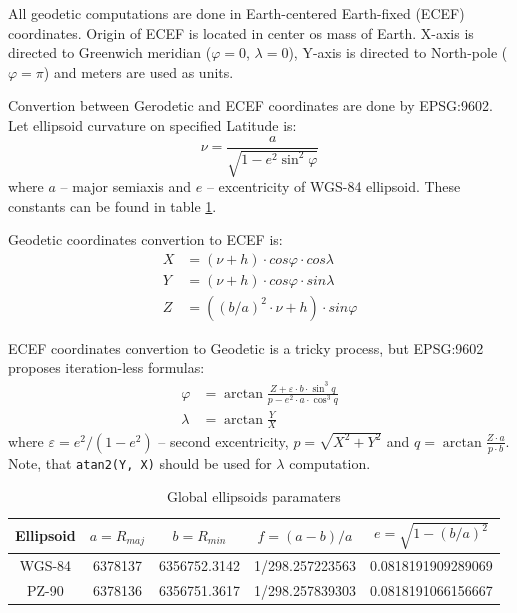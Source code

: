 \documentclass[10pt,letterpaper]{article}
\numberwithin{equation}{section}
\numberwithin{figure}{section}
\numberwithin{table}{section}
\begin{document}
All geodetic computations are done in Earth-centered Earth-fixed (ECEF) coordinates.
Origin of ECEF is located in center os mass of Earth. X-axis is directed to Greenwich
meridian ($\varphi = 0$, $\lambda = 0$), Y-axis is directed to North-pole ($\varphi = \pi$)
and meters are used as units.

Convertion between Gerodetic and ECEF coordinates are done by EPSG:9602.
Let ellipsoid curvature on specified Latitude is:
\begin{equation}
    \nu = \frac{a}{\sqrt{1 - e^2 \sin^2 \varphi}}
\end{equation}
where $a$ -- major semiaxis and $e$ -- excentricity of WGS-84 ellipsoid. These constants
can be found in table \ref{tab:ellps}.

Geodetic coordinates convertion to ECEF is:
\begin{equation}
    \begin{split}
        X & = (\nu + h) \cdot cos \varphi \cdot cos \lambda \\
        Y & = (\nu + h) \cdot cos \varphi \cdot sin \lambda \\
        Z & = ((b / a)^2 \cdot \nu + h) \cdot sin \varphi
    \end{split}
    \label{equ:geod2ecef}
\end{equation}

ECEF coordinates convertion to Geodetic is a tricky process, but EPSG:9602 proposes
iteration-less formulas:
\begin{equation}
    \begin{split}
        \varphi & = \arctan \frac{Z + \varepsilon \cdot b \cdot \sin^3 q}{p - e^2 \cdot a \cdot \cos^3 q} \\
        \lambda & = \arctan \frac{Y}{X}
    \end{split}
    \label{equ:ecef2geod}
\end{equation}
where $\varepsilon = e^2 / (1 - e^2)$ -- second excentricity, $p = \sqrt{X^2 + Y^2}$ and
$q = \arctan \frac{Z \cdot a}{p \cdot b}$. Note, that \texttt{atan2(Y, X)} should be used for
$\lambda$ computation.

\begin{table}[h]
    \centering
    \begin{tabular}{  c | c | c | c | c  }
        \hline
        Ellipsoid & $a=R_{maj}$ & $b=R_{min} $ & $f=(a-b)/a$ & $e=\sqrt{1-(b/a)^{2}}$ \\
        \hline
        WGS-84 & 6378137 & 6356752.3142 & 1/298.257223563 & 0.0818191909289069 \\
        PZ-90  & 6378136 & 6356751.3617 & 1/298.257839303 & 0.0818191066156667 \\
        \hline
    \end{tabular}
    \caption{Global ellipsoids paramaters}
    \label{tab:ellps}
\end{table}
\end{document}
